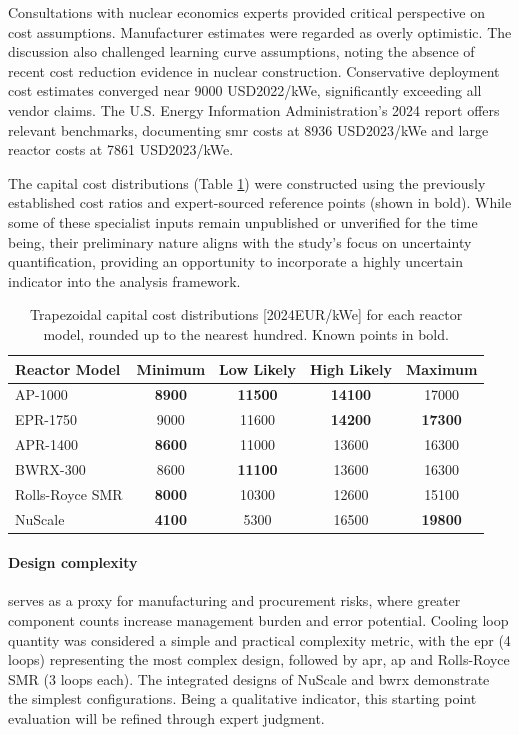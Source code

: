 Consultations with nuclear economics experts provided critical perspective on cost assumptions. Manufacturer estimates were regarded as overly optimistic. The discussion also challenged learning curve assumptions, noting the absence of recent cost reduction evidence in nuclear construction. Conservative deployment cost estimates converged near 9000 USD2022/kWe, significantly exceeding all vendor claims. The U.S. Energy Information Administration's 2024 report \cite{EIA_Capital_Costs_AEO2024} offers relevant benchmarks, documenting \gls{smr} costs at 8936 USD2023/kWe and large reactor costs at 7861 USD2023/kWe.

The capital cost distributions (Table \ref{tab:capex-distributions}) were constructed using the previously established cost ratios and expert-sourced reference points (shown in bold). While some of these specialist inputs remain unpublished or unverified for the time being, their preliminary nature aligns with the study's focus on uncertainty quantification, providing an opportunity to incorporate a highly uncertain indicator into the analysis framework.

\begin{table}[!hb]
    \centering
    \begin{tabularx}{0.9\textwidth}{Xcccc}
        \toprule
        \textbf{Reactor Model} & \textbf{Minimum} & \textbf{Low Likely} & \textbf{High Likely} & \textbf{Maximum} \\
        \midrule
        AP-1000          & \textbf{8900} & \textbf{11500} & \textbf{14100} & 17000 \\
        EPR-1750        & 9000 & 11600 & \textbf{14200} & \textbf{17300} \\
        APR-1400         & \textbf{8600} & 11000 & 13600 & 16300 \\
        BWRX-300        &  8600 & \textbf{11100} & 13600 & 16300 \\
        Rolls-Royce SMR & \textbf{8000} & 10300 & 12600 & 15100 \\
        NuScale         & \textbf{4100} & 5300 & 16500 & \textbf{19800} \\
        \bottomrule
    \end{tabularx}
    \caption{Trapezoidal capital cost distributions [2024EUR/kWe] for each reactor model, rounded up to the nearest hundred. Known points in bold.}
    \label{tab:capex-distributions}
\end{table}

\paragraph{Design complexity} serves as a proxy for manufacturing and procurement risks, where greater component counts increase management burden and error potential. Cooling loop quantity was considered a simple and practical complexity metric, with the \gls{epr} (4 loops) representing the most complex design, followed by \gls{apr}, \gls{ap} and Rolls-Royce SMR (3 loops each). The integrated designs of NuScale and \gls{bwrx} demonstrate the simplest configurations. Being a qualitative indicator, this starting point evaluation will be refined through expert judgment.

